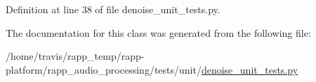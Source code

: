 Definition at line 38 of file denoise\-\_\-unit\-\_\-tests.\-py.



The documentation for this class was generated from the following file\-:\begin{DoxyCompactItemize}
\item 
/home/travis/rapp\-\_\-temp/rapp-\/platform/rapp\-\_\-audio\-\_\-processing/tests/unit/\hyperlink{denoise__unit__tests_8py}{denoise\-\_\-unit\-\_\-tests.\-py}\end{DoxyCompactItemize}
